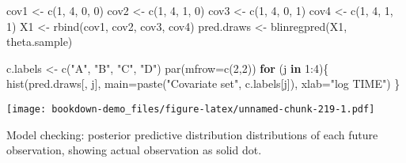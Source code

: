 \documentclass[
]{book}
\newenvironment{Shaded}{\begin{snugshade}}{\end{snugshade}}
\newcommand{\AttributeTok}[1]{\textcolor[rgb]{0.77,0.63,0.00}{#1}}
\newcommand{\ControlFlowTok}[1]{\textcolor[rgb]{0.13,0.29,0.53}{\textbf{#1}}}
\newcommand{\DecValTok}[1]{\textcolor[rgb]{0.00,0.00,0.81}{#1}}
\newcommand{\FunctionTok}[1]{\textcolor[rgb]{0.00,0.00,0.00}{#1}}
\newcommand{\NormalTok}[1]{#1}
\newcommand{\OtherTok}[1]{\textcolor[rgb]{0.56,0.35,0.01}{#1}}
\newcommand{\SpecialCharTok}[1]{\textcolor[rgb]{0.00,0.00,0.00}{#1}}
\newcommand{\StringTok}[1]{\textcolor[rgb]{0.31,0.60,0.02}{#1}}
\begin{document}
\begin{Shaded}
\begin{Highlighting}[]
\NormalTok{cov1 }\OtherTok{\textless{}{-}} \FunctionTok{c}\NormalTok{(}\DecValTok{1}\NormalTok{, }\DecValTok{4}\NormalTok{, }\DecValTok{0}\NormalTok{, }\DecValTok{0}\NormalTok{)}
\NormalTok{cov2 }\OtherTok{\textless{}{-}} \FunctionTok{c}\NormalTok{(}\DecValTok{1}\NormalTok{, }\DecValTok{4}\NormalTok{, }\DecValTok{1}\NormalTok{, }\DecValTok{0}\NormalTok{)}
\NormalTok{cov3 }\OtherTok{\textless{}{-}} \FunctionTok{c}\NormalTok{(}\DecValTok{1}\NormalTok{, }\DecValTok{4}\NormalTok{, }\DecValTok{0}\NormalTok{, }\DecValTok{1}\NormalTok{)}
\NormalTok{cov4 }\OtherTok{\textless{}{-}} \FunctionTok{c}\NormalTok{(}\DecValTok{1}\NormalTok{, }\DecValTok{4}\NormalTok{, }\DecValTok{1}\NormalTok{, }\DecValTok{1}\NormalTok{)}
\NormalTok{X1 }\OtherTok{\textless{}{-}} \FunctionTok{rbind}\NormalTok{(cov1, cov2, cov3, cov4)}
\NormalTok{pred.draws }\OtherTok{\textless{}{-}} \FunctionTok{blinregpred}\NormalTok{(X1, theta.sample)}
\end{Highlighting}
\end{Shaded}

\begin{Shaded}
\begin{Highlighting}[]
\NormalTok{c.labels }\OtherTok{\textless{}{-}} \FunctionTok{c}\NormalTok{(}\StringTok{"A"}\NormalTok{, }\StringTok{"B"}\NormalTok{, }\StringTok{"C"}\NormalTok{, }\StringTok{"D"}\NormalTok{)}
\FunctionTok{par}\NormalTok{(}\AttributeTok{mfrow=}\FunctionTok{c}\NormalTok{(}\DecValTok{2}\NormalTok{,}\DecValTok{2}\NormalTok{))}
\ControlFlowTok{for}\NormalTok{ (j }\ControlFlowTok{in} \DecValTok{1}\SpecialCharTok{:}\DecValTok{4}\NormalTok{)\{}
   \FunctionTok{hist}\NormalTok{(pred.draws[, j],}
      \AttributeTok{main=}\FunctionTok{paste}\NormalTok{(}\StringTok{"Covariate set"}\NormalTok{,}
\NormalTok{                 c.labels[j]),}
      \AttributeTok{xlab=}\StringTok{"log TIME"}\NormalTok{)}
\NormalTok{\}}
\end{Highlighting}
\end{Shaded}

\texttt{[image: bookdown-demo\_files/figure-latex/unnamed-chunk-219-1.pdf]}

Model checking: posterior predictive distribution distributions of each future observation, showing actual observation as solid dot.
\end{document}
